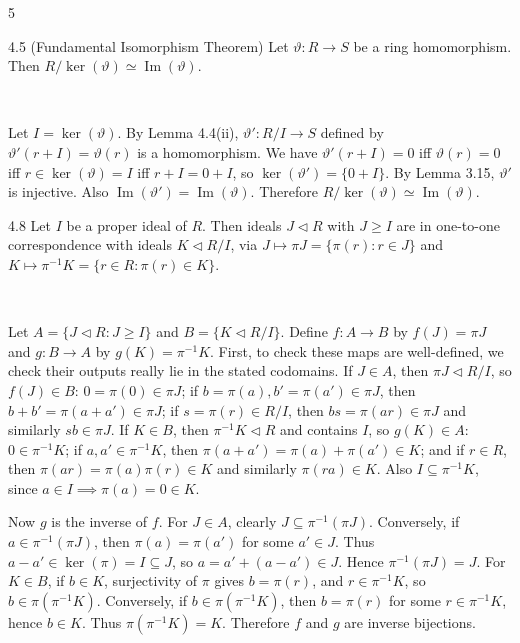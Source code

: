 \documentclass[8pt]{extarticle}
\makeatletter
\renewenvironment{proof}[1][\proofname]{%
  \pushQED{\qed}%
  \par\noindent\normalfont\itshape #1\@addpunct{.}\ \normalfont\ignorespaces
}{%
  \popQED%
  \par
}
\makeatother
\begin{document}
\begin{multicols*}{5}
        \begin{theorem}{4.5}
            (Fundamental Isomorphism Theorem) Let \(\vartheta:R\to S\) be a ring homomorphism. Then \(R/\ker(\vartheta)\simeq\operatorname{Im}(\vartheta)\).
        \end{theorem}

        \begin{proof}
            Let \(I=\ker(\vartheta)\). By Lemma 4.4(ii), \(\vartheta':R/I\to S\) defined by \(\vartheta'(r+I)=\vartheta(r)\) is a homomorphism. We have \(\vartheta'(r+I)=0\) iff \(\vartheta(r)=0\) iff \(r\in\ker(\vartheta)=I\) iff \(r+I=0+I\), so \(\ker(\vartheta')=\{0+I\}\). By Lemma 3.15, \(\vartheta'\) is injective. Also \(\operatorname{Im}(\vartheta')=\operatorname{Im}(\vartheta)\). Therefore \(R/\ker(\vartheta)\simeq\operatorname{Im}(\vartheta)\).
        \end{proof}

        \begin{theorem}{4.8}
            Let \(I\) be a proper ideal of \(R\). Then ideals \(J\lhd R\) with \(J\ge I\) are in one-to-one correspondence with ideals \(K\lhd R/I\), via \(J\mapsto\pi J=\{\pi(r):r\in J\}\) and \(K\mapsto\pi^{-1}K=\{r\in R:\pi(r)\in K\}\).
        \end{theorem}

        \begin{proof}
            Let \(A=\{J\lhd R:J\ge I\}\) and \(B=\{K\lhd R/I\}\). Define \(f:A\to B\) by \(f(J)=\pi J\) and \(g:B\to A\) by \(g(K)=\pi^{-1}K\). First, to check these maps are well-defined, we check their outputs really lie in the stated codomains. If \(J\in A\), then \(\pi J\lhd R/I\), so \(f(J)\in B\): \(0=\pi(0)\in\pi J\); if \(b=\pi(a),b'=\pi(a')\in\pi J\), then \(b+b'=\pi(a+a')\in\pi J\); if \(s=\pi(r)\in R/I\), then \(bs=\pi(ar)\in\pi J\) and similarly \(sb\in\pi J\). If \(K\in B\), then \(\pi^{-1}K\lhd R\) and contains \(I\), so \(g(K)\in A\): \(0\in\pi^{-1}K\); if \(a,a'\in\pi^{-1}K\), then \(\pi(a+a')=\pi(a)+\pi(a')\in K\); and if \(r\in R\), then \(\pi(ar)=\pi(a)\pi(r)\in K\) and similarly \(\pi(ra)\in K\). Also \(I\subseteq\pi^{-1}K\), since \(a\in I\implies\pi(a)=0\in K\).

            Now \(g\) is the inverse of \(f\). For \(J\in A\), clearly \(J\subseteq\pi^{-1}(\pi J)\). Conversely, if \(a\in\pi^{-1}(\pi J)\), then \(\pi(a)=\pi(a')\) for some \(a'\in J\). Thus \(a-a'\in\ker(\pi)=I\subseteq J\), so \(a=a'+(a-a')\in J\). Hence \(\pi^{-1}(\pi J)=J\). For \(K\in B\), if \(b\in K\), surjectivity of \(\pi\) gives \(b=\pi(r)\), and \(r\in\pi^{-1}K\), so \(b\in\pi(\pi^{-1}K)\). Conversely, if \(b\in\pi(\pi^{-1}K)\), then \(b=\pi(r)\) for some \(r\in\pi^{-1}K\), hence \(b\in K\). Thus \(\pi(\pi^{-1}K)=K\). Therefore \(f\) and \(g\) are inverse bijections.
        \end{proof}


\end{multicols*}
\end{document}
